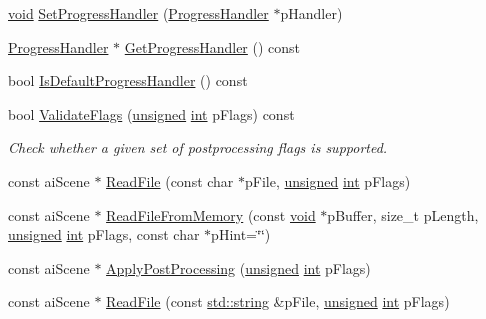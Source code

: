 \begin{DoxyCompactItemize}
\item 
\hyperlink{wglew_8h_aeea6e3dfae3acf232096f57d2d57f084}{void} \hyperlink{class_assimp_1_1_importer_a6a4d830ffb3f77a3c7c919e0af006920}{Set\-Progress\-Handler} (\hyperlink{class_assimp_1_1_progress_handler}{Progress\-Handler} $\ast$p\-Handler)
\item 
\hyperlink{class_assimp_1_1_progress_handler}{Progress\-Handler} $\ast$ \hyperlink{class_assimp_1_1_importer_a1fa669f0edc504fdf9178e8e22c728ad}{Get\-Progress\-Handler} () const 
\item 
bool \hyperlink{class_assimp_1_1_importer_a2d60d970eddf8f9d35b6e9b54214cedd}{Is\-Default\-Progress\-Handler} () const 
\item 
bool \hyperlink{class_assimp_1_1_importer_a780329e2dd0406e930291cf8ab9deb99}{Validate\-Flags} (\hyperlink{_free_image_8h_a425076c7067a1b5166e2cc530e914814}{unsigned} \hyperlink{wglew_8h_a500a82aecba06f4550f6849b8099ca21}{int} p\-Flags) const 
\begin{DoxyCompactList}\small\item\em Check whether a given set of postprocessing flags is supported. \end{DoxyCompactList}\item 
const ai\-Scene $\ast$ \hyperlink{class_assimp_1_1_importer_a174418ab41d5b8bc51a044895cb991e5}{Read\-File} (const char $\ast$p\-File, \hyperlink{_free_image_8h_a425076c7067a1b5166e2cc530e914814}{unsigned} \hyperlink{wglew_8h_a500a82aecba06f4550f6849b8099ca21}{int} p\-Flags)
\item 
const ai\-Scene $\ast$ \hyperlink{class_assimp_1_1_importer_a9b3c5e8b1042702f449e84a95b3324f6}{Read\-File\-From\-Memory} (const \hyperlink{wglew_8h_aeea6e3dfae3acf232096f57d2d57f084}{void} $\ast$p\-Buffer, size\-\_\-t p\-Length, \hyperlink{_free_image_8h_a425076c7067a1b5166e2cc530e914814}{unsigned} \hyperlink{wglew_8h_a500a82aecba06f4550f6849b8099ca21}{int} p\-Flags, const char $\ast$p\-Hint=\char`\"{}\char`\"{})
\item 
const ai\-Scene $\ast$ \hyperlink{class_assimp_1_1_importer_a5872e749c1451fee64183fc14f1fc81d}{Apply\-Post\-Processing} (\hyperlink{_free_image_8h_a425076c7067a1b5166e2cc530e914814}{unsigned} \hyperlink{wglew_8h_a500a82aecba06f4550f6849b8099ca21}{int} p\-Flags)
\item 
const ai\-Scene $\ast$ \hyperlink{class_assimp_1_1_importer_a339882c7acb47d5b5110bbd078d870a9}{Read\-File} (const \hyperlink{glew_8h_ae84541b4f3d8e1ea24ec0f466a8c568b}{std\-::string} \&p\-File, \hyperlink{_free_image_8h_a425076c7067a1b5166e2cc530e914814}{unsigned} \hyperlink{wglew_8h_a500a82aecba06f4550f6849b8099ca21}{int} p\-Flags)

\end{DoxyCompactItemize}
